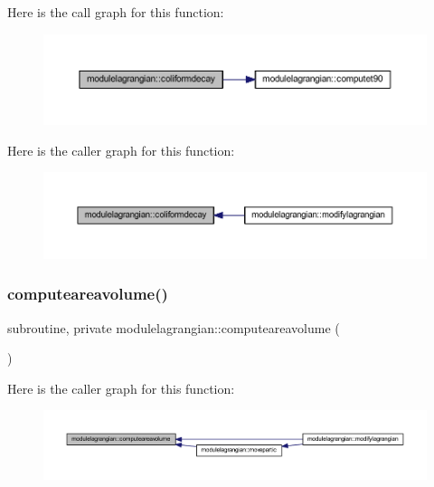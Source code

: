 Here is the call graph for this function\+:\nopagebreak
\begin{figure}[H]
\begin{center}
\leavevmode
\includegraphics[width=350pt]{namespacemodulelagrangian_a24e84b1ba147f10917d0d3cd3564d191_cgraph}
\end{center}
\end{figure}
Here is the caller graph for this function\+:\nopagebreak
\begin{figure}[H]
\begin{center}
\leavevmode
\includegraphics[width=350pt]{namespacemodulelagrangian_a24e84b1ba147f10917d0d3cd3564d191_icgraph}
\end{center}
\end{figure}
\mbox{\label{namespacemodulelagrangian_a5a4818cc1397ad3373693bc882af863f}} 
\subsubsection{\texorpdfstring{computeareavolume()}{computeareavolume()}}
{\footnotesize\ttfamily subroutine, private modulelagrangian\+::computeareavolume (\begin{DoxyParamCaption}{ }\end{DoxyParamCaption})\hspace{0.3cm}{\ttfamily [private]}}

Here is the caller graph for this function\+:\nopagebreak
\begin{figure}[H]
\begin{center}
\leavevmode
\includegraphics[width=350pt]{namespacemodulelagrangian_a5a4818cc1397ad3373693bc882af863f_icgraph}
\end{center}
\end{figure}
\mbox{\label{namespacemodulelagrangian_afbe53c51100e0ccf05c86c57cde70d49}} 
